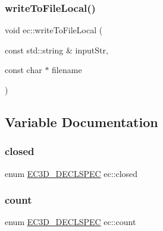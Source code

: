 \mbox{\label{namespaceec_aaae259d9413b28eb2a234fccc4e63985}} 
\subsubsection{\texorpdfstring{write\+To\+File\+Local()}{writeToFileLocal()}}
{\footnotesize\ttfamily void ec\+::write\+To\+File\+Local (\begin{DoxyParamCaption}\item[{const std\+::string \&}]{input\+Str,  }\item[{const char $\ast$}]{filename }\end{DoxyParamCaption})}



\subsection{Variable Documentation}
\mbox{\label{namespaceec_a50f9b2ea9dbfffe311ceb6f857573272}} 
\subsubsection{\texorpdfstring{closed}{closed}}
{\footnotesize\ttfamily enum \mbox{\hyperlink{_common_8h_aac42573e202ca3dd4d259c81691e2369}{E\+C3\+D\+\_\+\+D\+E\+C\+L\+S\+P\+EC}} ec\+::closed\hspace{0.3cm}{\ttfamily [strong]}}

\mbox{\label{namespaceec_a4dc8d59c4e90842e057344aefde0efbd}} 
\subsubsection{\texorpdfstring{count}{count}}
{\footnotesize\ttfamily enum \mbox{\hyperlink{_common_8h_aac42573e202ca3dd4d259c81691e2369}{E\+C3\+D\+\_\+\+D\+E\+C\+L\+S\+P\+EC}} ec\+::count\hspace{0.3cm}{\ttfamily [strong]}}

\mbox{\label{namespaceec_a7d6502eddc910822e32f6ba96543bb05}} 
